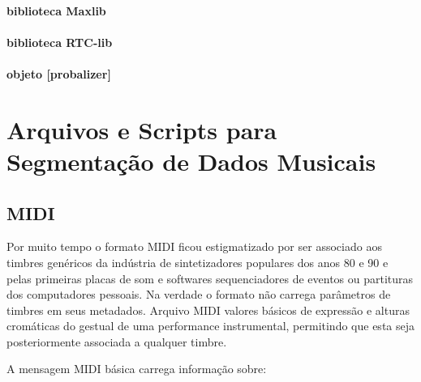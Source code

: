 \documentclass[
	12pt,				%
	openright,			%
	twoside,			%
	a4paper,			%
	english,			%
	french,				%
	spanish,			%
	brazil				%
	]{abntex2}
\begin{document}
\subsubsection{biblioteca Maxlib}

\subsubsection{biblioteca RTC-lib}

\subsubsection{objeto [probalizer]}



\chapter{Arquivos e Scripts para Segmentação de Dados Musicais}
\label{formatos}

\section{MIDI}

Por muito tempo o formato MIDI ficou estigmatizado por ser associado aos timbres genéricos da indústria de sintetizadores populares dos anos 80 e 90 e pelas primeiras placas de som e softwares sequenciadores de eventos ou partituras dos computadores pessoais. 
Na verdade o formato não carrega parâmetros de timbres em seus metadados. Arquivo MIDI valores básicos de expressão e alturas cromáticas do gestual de uma performance instrumental, permitindo que esta seja posteriormente associada a qualquer timbre.

A mensagem MIDI básica carrega informação sobre:
\end{document}
